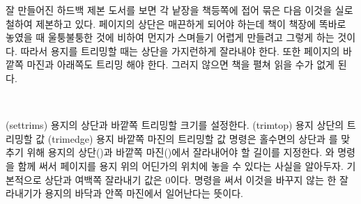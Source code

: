 잘 만들어진 하드백 제본 도서를 보면 각 낱장을 책등쪽에 접어 묶은 다음
이것을 실로 철하여 제본하고 있다. 페이지의 상단은 매끈하게 되어야 하는데
책이 책장에 똑바로 놓였을 때 울퉁불퉁한 것에 비하여 먼지가 스며들기
어렵게 만들려고 그렇게 하는 것이다. 따라서 용지를 트리밍할 때는
상단을 가지런하게 잘라내야 한다.
또한 페이지의 바깥쪽 마진과 아래쪽도 트리밍 해야 한다. 그러지 않으면
책을 펼쳐 읽을 수가 없게 된다.

\begin{syntax}
\cmd{\settrims} \\
\end{syntax}
\glossary(settrims)%
  {}%
  {용지의 상단과 바깥쪽 트리밍할 크기를 설정한다.}
\glossary(trimtop)%
  {}%
  {용지 상단의 트리밍할 값}
\glossary(trimedge)%
  {}%
  {용지 바깥쪽 마진의 트리밍할 값}
\cmd{\settrims} 명령은 홀수면의 상단과 \foredge{}를 맞추기 위해
용지의 상단()과 바깥쪽 마진()에서 잘라내어야 할 길이를 지정한다.
\cmd{\settrims}와 \cmd{\settrimmedsize} 명령을 함께 써서 페이지를
용지 위의 어딘가의 위치에 놓을 수 있다는 사실을 알아두자.
기본적으로 상단과 여백쪽 잘라내기 값은 0이다. \cmd{\settrims} 명령을
써서 이것을 바꾸지 않는 한 잘라내기가 용지의 바닥과 안쪽 마진에서 일어난다는 뜻이다.

